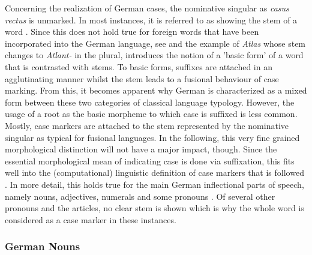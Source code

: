 \documentclass[11pt,a4paper,twoside,openright]{scrbook}
\begin{document}
Concerning the realization of German cases, the nominative singular as \textit{casus rectus} is unmarked. In most instances, it is referred to as showing the stem of a word \citep{sahel2018ger}. Since this does not hold true for foreign words that have been incorporated into the German language, see \citet{elsen2014ger} and the example of \textit{Atlas} whose stem changes to \textit{Atlant-} in the plural, \citet{eisenberg2020ger} introduces the notion of a 'basic form' of a word that is contrasted with stems. To basic forms, suffixes are attached in an agglutinating manner whilst the stem leads to a fusional behaviour of case marking. From this, it becomes apparent why German is characterized as a mixed form between these two categories of classical language typology. However, the usage of a root as the basic morpheme to which case is suffixed is less common. Mostly, case markers are attached to the stem represented by the nominative singular as typical for fusional languages. In the following, this very fine grained morphological distinction will not have a major impact, though. Since the essential morphological mean of indicating case is done via suffixation, this fits well into the (computational) linguistic definition of case markers that is followed \citep{sahel2018ger}. In more detail, this holds true for the main German inflectional parts of speech, namely nouns, adjectives, numerals and some pronouns \citep{eisenberg2020ger}. Of several other pronouns and the articles, no clear stem is shown which is why the whole word is considered as a case marker in these instances.  





\subsubsection{German Nouns}
\end{document}
